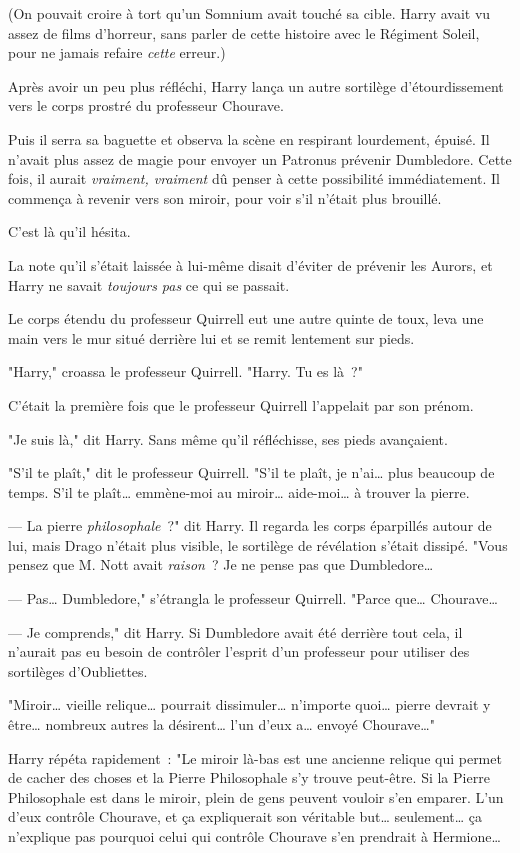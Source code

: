(On pouvait croire à tort qu'un Somnium avait touché sa cible. Harry avait vu assez de films d'horreur, sans parler de cette histoire avec le Régiment Soleil, pour ne jamais refaire \emph{cette} erreur.)

Après avoir un peu plus réfléchi, Harry lança un autre sortilège d'étourdissement vers le corps prostré du professeur Chourave.

Puis il serra sa baguette et observa la scène en respirant lourdement, épuisé. Il n'avait plus assez de magie pour envoyer un Patronus prévenir Dumbledore. Cette fois, il aurait \emph{vraiment, vraiment} dû penser à cette possibilité immédiatement. Il commença à revenir vers son miroir, pour voir s'il n'était plus brouillé.

C'est là qu'il hésita.

La note qu'il s'était laissée à lui-même disait d'éviter de prévenir les Aurors, et Harry ne savait \emph{toujours pas} ce qui se passait.

Le corps étendu du professeur Quirrell eut une autre quinte de toux, leva une main vers le mur situé derrière lui et se remit lentement sur pieds.

"Harry," croassa le professeur Quirrell. "Harry. Tu es là~?"

C'était la première fois que le professeur Quirrell l'appelait par son prénom.

"Je suis là," dit Harry. Sans même qu'il réfléchisse, ses pieds avançaient.

"S'il te plaît," dit le professeur Quirrell. "S'il te plaît, je n'ai… plus beaucoup de temps. S'il te plaît… emmène-moi au miroir… aide-moi… à trouver la pierre.

--- La pierre \emph{philosophale}~?" dit Harry. Il regarda les corps éparpillés autour de lui, mais Drago n'était plus visible, le sortilège de révélation s'était dissipé. "Vous pensez que M. Nott avait \emph{raison}~? Je ne pense pas que Dumbledore…

--- Pas… Dumbledore," s'étrangla le professeur Quirrell. "Parce que… Chourave…

--- Je comprends," dit Harry. Si Dumbledore avait été derrière tout cela, il n'aurait pas eu besoin de contrôler l'esprit d'un professeur pour utiliser des sortilèges d'Oubliettes.

"Miroir… vieille relique… pourrait dissimuler… n'importe quoi… pierre devrait y être… nombreux autres la désirent… l'un d'eux a… envoyé Chourave…"

Harry répéta rapidement~: "Le miroir là-bas est une ancienne relique qui permet de cacher des choses et la Pierre Philosophale s'y trouve peut-être. Si la Pierre Philosophale est dans le miroir, plein de gens peuvent vouloir s'en emparer. L'un d'eux contrôle Chourave, et ça expliquerait son véritable but… seulement… ça n'explique pas pourquoi celui qui contrôle Chourave s'en prendrait à Hermione…


